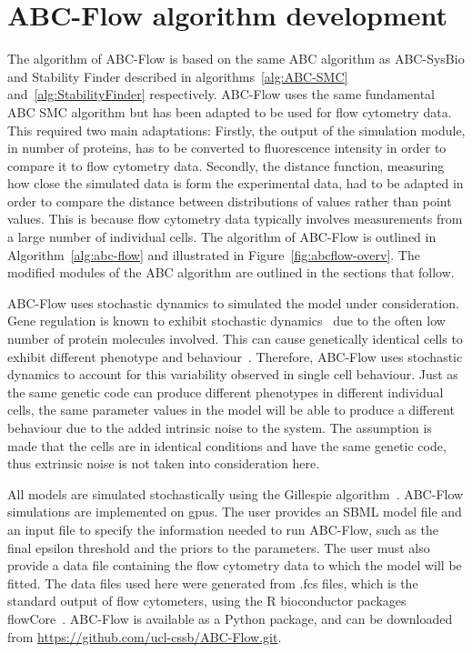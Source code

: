 \section{ABC-Flow algorithm development}
\label{sec:abcflow-meth}

The algorithm of ABC-Flow is based on the same ABC algorithm as ABC-SysBio and Stability Finder described in algorithms~\ref{alg:ABC-SMC} and~\ref{alg:StabilityFinder} respectively. ABC-Flow uses the same fundamental ABC SMC algorithm but has been adapted to be used for flow cytometry data. This required two main adaptations: Firstly, the output of the simulation module, in number of proteins, has to be converted to fluorescence intensity in order to compare it to flow cytometry data. Secondly, the distance function, measuring how close the simulated  data is form the experimental data, had to be adapted in order to compare the distance between distributions of values rather than point values. This is because flow cytometry data typically involves measurements from a large number of individual cells. The algorithm of ABC-Flow is outlined in Algorithm~\ref{alg:abc-flow} and illustrated in Figure~\ref{fig:abcflow-overv}. The modified modules of the ABC algorithm are outlined in the sections that follow.


ABC-Flow uses stochastic dynamics to simulated the model under consideration. Gene regulation is known to exhibit stochastic dynamics~\autocite{Elowitz:2002wq} due to the often low number of protein molecules involved. This can cause genetically identical cells to exhibit different phenotype and behaviour~\autocite{Weinberger:2005uv}. Therefore, ABC-Flow uses stochastic dynamics to account for this variability observed in single cell behaviour. Just as the same genetic code can produce different phenotypes in different individual cells, the same parameter values in the model will be able to produce a different behaviour due to the added intrinsic noise to the system. The assumption is made that the cells are in identical conditions and have the same genetic code, thus extrinsic noise is not taken into consideration here.  


All models are simulated stochastically using the Gillespie algorithm~\autocite{Gillespie:1977ww}. ABC-Flow simulations are implemented on \acrshort{gpu}s. The user provides an SBML model file and an input file to specify the information needed to run ABC-Flow, such as the final epsilon threshold and the priors to the parameters. The user must also provide a data file containing the flow cytometry data to which the model will be fitted. The data files used here were generated from .fcs files, which is the standard output of flow cytometers, using the R bioconductor packages flowCore~\autocite{flowCore:man}. ABC-Flow is available as a Python package, and can be downloaded from \url{https://github.com/ucl-cssb/ABC-Flow.git}. 



